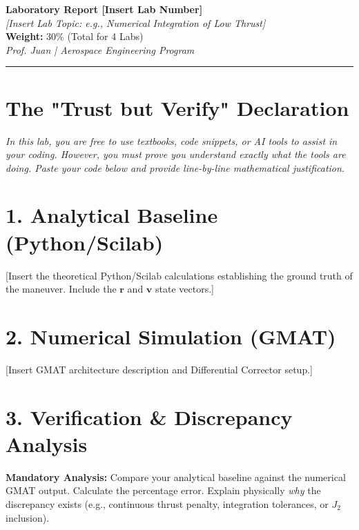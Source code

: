\documentclass[11pt, letterpaper]{article}
\begin{document}
\begin{center}
    {\Large \textbf{Laboratory Report [Insert Lab Number]}} \\
    \vspace{0.2cm}
    {\large \textit{[Insert Lab Topic: e.g., Numerical Integration of Low Thrust]}} \\
    \vspace{0.4cm}
    \textbf{Weight:} 30\% (Total for 4 Labs) \\
    \textit{Prof. Juan | Aerospace Engineering Program}
\end{center}

\hrule
\vspace{0.5cm}

\section*{The "Trust but Verify" Declaration}
\textit{In this lab, you are free to use textbooks, code snippets, or AI tools to assist in your coding. However, you must prove you understand exactly what the tools are doing. Paste your code below and provide line-by-line mathematical justification.}

\section*{1. Analytical Baseline (Python/Scilab)}
[Insert the theoretical Python/Scilab calculations establishing the ground truth of the maneuver. Include the $\boldsymbol{r}$ and $\boldsymbol{v}$ state vectors.]

\section*{2. Numerical Simulation (GMAT)}
[Insert GMAT architecture description and Differential Corrector setup.]

\section*{3. Verification \& Discrepancy Analysis}
\textbf{Mandatory Analysis:} Compare your analytical baseline against the numerical GMAT output. Calculate the percentage error. Explain physically \textit{why} the discrepancy exists (e.g., continuous thrust penalty, integration tolerances, or $J_2$ inclusion).
\end{document}
